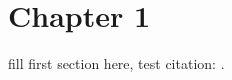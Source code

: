 
\section{Chapter 1}\label{sec:chapter1}

fill first section here, test citation: \cite{andersen2001}.